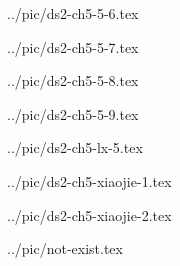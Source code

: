 

../pic/ds2-ch5-5-6.tex



../pic/ds2-ch5-5-7.tex



../pic/ds2-ch5-5-8.tex



../pic/ds2-ch5-5-9.tex



../pic/ds2-ch5-lx-5.tex



../pic/ds2-ch5-xiaojie-1.tex



../pic/ds2-ch5-xiaojie-2.tex



../pic/not-exist.tex


